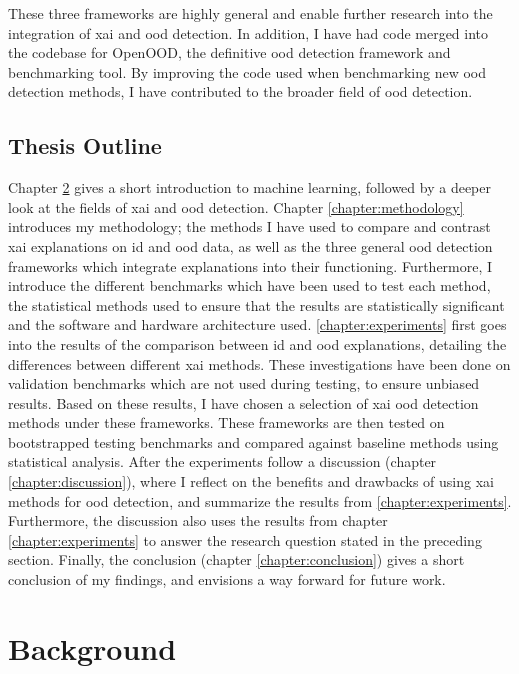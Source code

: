\documentclass[UKenglish]{uiomasterthesis} %
\theoremstyle{definition}
\begin{document}
These three frameworks are highly general and enable further research into the integration of \ac{xai} and \ac{ood} detection. In addition, I have had code merged into the codebase for OpenOOD, the definitive \ac{ood} detection framework and benchmarking tool. By improving the code used when benchmarking new \ac{ood} detection methods, I have contributed to the broader field of \ac{ood} detection.

\section{Thesis Outline}

Chapter \ref{chapter:background} gives a short introduction to machine learning, followed by a deeper look at the fields of \ac{xai} and \ac{ood} detection. Chapter \ref{chapter:methodology} introduces my methodology; the methods I have used to compare and contrast \ac{xai} explanations on \ac{id} and \ac{ood} data, as well as the three general \ac{ood} detection frameworks which integrate explanations into their functioning. Furthermore, I introduce the different benchmarks which have been used to test each method, the statistical methods used to ensure that the results are statistically significant and the software and hardware architecture used. \ref{chapter:experiments} first goes into the results of the comparison between \ac{id} and \ac{ood} explanations, detailing the differences between different \ac{xai} methods. These investigations have been done on validation benchmarks which are not used during testing, to ensure unbiased results. Based on these results, I have chosen a selection of \ac{xai} \ac{ood} detection methods under these frameworks. These frameworks are then tested on bootstrapped testing benchmarks and compared against baseline methods using statistical analysis. After the experiments follow a discussion (chapter \ref{chapter:discussion}), where I reflect on the benefits and drawbacks of using \ac{xai} methods for \ac{ood} detection, and summarize the results from \ref{chapter:experiments}. Furthermore, the discussion also uses the results from chapter \ref{chapter:experiments} to answer the research question stated in the preceding section. Finally, the conclusion (chapter \ref{chapter:conclusion}) gives a short conclusion of my findings, and envisions a way forward for future work.

\chapter{Background} \label{chapter:background}
\end{document}
